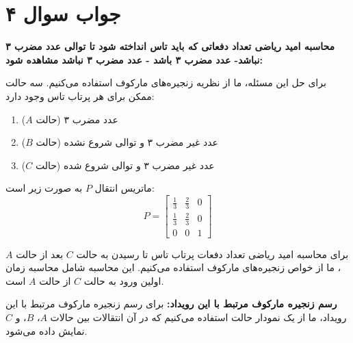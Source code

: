 \section*{جواب سوال ۴}

\textbf{محاسبه امید ریاضی تعداد دفعاتی که باید تاس انداخته شود تا توالی عدد مضرب ۳ نباشد- عدد مضرب ۳ باشد - عدد مضرب ۳ نباشد مشاهده شود:}

برای حل این مسئله، ما از نظریه زنجیره‌های مارکوف استفاده می‌کنیم. سه حالت ممکن برای هر پرتاب تاس وجود دارد:
\begin{enumerate}
	\item عدد مضرب ۳ (حالت \(A\))
	\item عدد غیر مضرب ۳ و توالی شروع نشده (حالت \(B\))
	\item عدد غیر مضرب ۳ و توالی شروع شده (حالت \(C\))
\end{enumerate}

ماتریس انتقال \(P\) به صورت زیر است:
\[ P = \begin{bmatrix}
	\frac{1}{3} & \frac{2}{3} & 0 \\
	\frac{1}{3} & \frac{2}{3} & 0 \\
	0 & 0 & 1
\end{bmatrix} \]

برای محاسبه امید ریاضی تعداد دفعات پرتاب تاس تا رسیدن به حالت \(C\) بعد از حالت \(A\)، ما از خواص زنجیره‌های مارکوف استفاده می‌کنیم. این محاسبه شامل محاسبه زمان اولین ورود به حالت \(C\) از حالت \(A\) است.

\textbf{رسم زنجیره مارکوف مرتبط با این رویداد:}
برای رسم زنجیره مارکوف مرتبط با این رویداد، ما از یک نمودار حالت استفاده می‌کنیم که در آن انتقالات بین حالات \(A\)، \(B\)، و \(C\) نمایش داده می‌شود.
